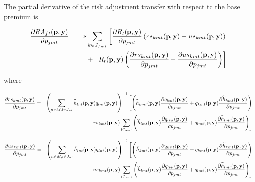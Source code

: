 \documentclass[12pt]{article}
\begin{document}
The partial derivative of the risk adjustment transfer with respect to the base premium is

\begin{footnotesize}
		
		\begin{eqnarray*}
			\frac{\partial RA_{ft}({\bf p},{\bf y})}{\partial p_{jmt}} &=& \nu \sum_{k \in J_{fmt}}  \left[\frac{\partial R_t({\bf p},{\bf y})}{\partial p_{jmt}}\left( rs_{kmt}({\bf p},{\bf y}) - us_{kmt}({\bf p},{\bf y})  \right) \right.\\
			&& + \,\,\, \left. R_t({\bf p},{\bf y}) \left( \frac{\partial rs_{kmt}({\bf p},{\bf y})}{\partial p_{jmt}} - \frac{\partial  us_{kmt}({\bf p},{\bf y})}{\partial p_{jmt}} \right) \right]
		\end{eqnarray*}
		
	\end{footnotesize}

\noindent where
	
	
	
	
	
	
	
	\begin{footnotesize}
		\setlength{\arraycolsep}{1.5pt}
		
		\begin{eqnarray*}
			\frac{ \partial rs_{kmt}({\bf p},{\bf y})}{\partial p_{jmt}} &=& \left(\sum_{n\in M,l \in J_{nt}} \widehat{h}_{lnt}({\bf p},{\bf y}) q_{lnt}({\bf p},{\bf y})\right)^{-1}\left[\left(\widehat{h}_{kmt}({\bf p},{\bf y})\frac{\partial q_{kmt}({\bf p},{\bf y})}{\partial p_{jmt}} + q_{kmt}({\bf p},{\bf y})\frac{\partial \widehat{h}_{kmt}({\bf p},{\bf y})}{\partial p_{jmt}} \right) \right.\\
			&& - \,\,\, \left. rs_{kmt}({\bf p},{\bf y}) \sum_{l \in J_{mt}}  \left(\widehat{h}_{lmt}({\bf p},{\bf y})\frac{\partial q_{lmt}({\bf p},{\bf y})}{\partial p_{jmt}} + q_{lmt}({\bf p},{\bf y})\frac{\partial \widehat{h}_{lmt}({\bf p},{\bf y})}{\partial p_{jmt}} \right)\right] 
		\end{eqnarray*}	
		
	\end{footnotesize}
	
	
	\begin{footnotesize}
		\setlength{\arraycolsep}{1.5pt}
		
		\begin{eqnarray*}
			\frac{ \partial us_{kmt}({\bf p},{\bf y})}{\partial p_{jmt}} &=& \left(\sum_{n\in M,l \in J_{nt}} \widetilde{h}_{lnt}({\bf p},{\bf y}) q_{lnt}({\bf p},{\bf y})\right)^{-1}\left[\left(\widetilde{h}_{kmt}({\bf p},{\bf y})\frac{\partial q_{kmt}({\bf p},{\bf y})}{\partial p_{jmt}} + q_{kmt}({\bf p},{\bf y})\frac{\partial \widetilde{h}_{kmt}({\bf p},{\bf y})}{\partial p_{jmt}} \right) \right.\\
			&& - \,\,\, \left. us_{kmt}({\bf p},{\bf y}) \sum_{l \in J_{mt}}  \left(\widetilde{h}_{lmt}({\bf p},{\bf y})\frac{\partial q_{lmt}({\bf p},{\bf y})}{\partial p_{jmt}} + q_{lmt}({\bf p},{\bf y})\frac{\partial\widetilde{h}_{lmt}({\bf p},{\bf y})}{\partial p_{jmt}} \right)\right] 
		\end{eqnarray*}	
		
	\end{footnotesize}
\end{document}
